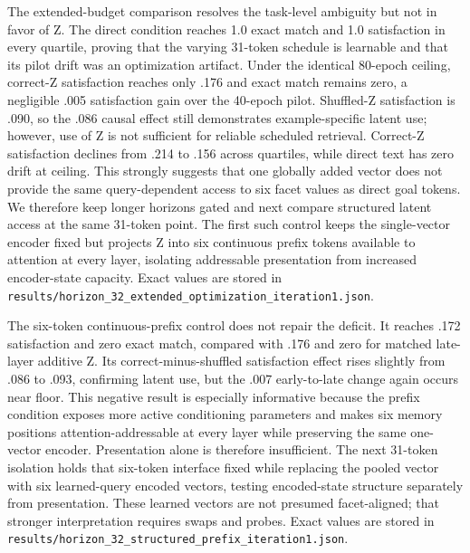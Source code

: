 \documentclass[11pt]{article}
\begin{document}
The extended-budget comparison resolves the task-level ambiguity but not in favor of Z. The direct condition reaches 1.0 exact match and 1.0 satisfaction in every quartile, proving that the varying 31-token schedule is learnable and that its pilot drift was an optimization artifact. Under the identical 80-epoch ceiling, correct-Z satisfaction reaches only .176 and exact match remains zero, a negligible .005 satisfaction gain over the 40-epoch pilot. Shuffled-Z satisfaction is .090, so the .086 causal effect still demonstrates example-specific latent use; however, use of Z is not sufficient for reliable scheduled retrieval. Correct-Z satisfaction declines from .214 to .156 across quartiles, while direct text has zero drift at ceiling. This strongly suggests that one globally added vector does not provide the same query-dependent access to six facet values as direct goal tokens. We therefore keep longer horizons gated and next compare structured latent access at the same 31-token point. The first such control keeps the single-vector encoder fixed but projects Z into six continuous prefix tokens available to attention at every layer, isolating addressable presentation from increased encoder-state capacity. Exact values are stored in \texttt{results/horizon\_32\_extended\_optimization\_iteration1.json}.

The six-token continuous-prefix control does not repair the deficit. It reaches .172 satisfaction and zero exact match, compared with .176 and zero for matched late-layer additive Z. Its correct-minus-shuffled satisfaction effect rises slightly from .086 to .093, confirming latent use, but the .007 early-to-late change again occurs near floor. This negative result is especially informative because the prefix condition exposes more active conditioning parameters and makes six memory positions attention-addressable at every layer while preserving the same one-vector encoder. Presentation alone is therefore insufficient. The next 31-token isolation holds that six-token interface fixed while replacing the pooled vector with six learned-query encoded vectors, testing encoded-state structure separately from presentation. These learned vectors are not presumed facet-aligned; that stronger interpretation requires swaps and probes. Exact values are stored in \texttt{results/horizon\_32\_structured\_prefix\_iteration1.json}.
\end{document}
